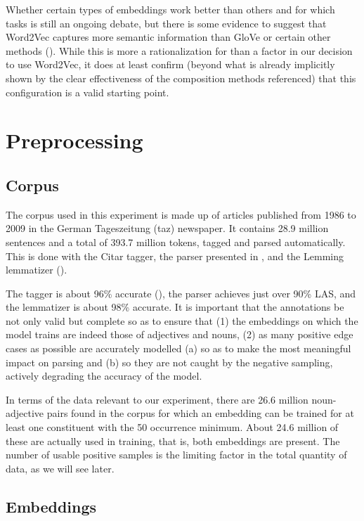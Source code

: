 \documentclass[a4paper, 11pt]{scrartcl}
\begin{document}
Whether certain types of embeddings work better than others and for which tasks is still an ongoing debate, but there is some evidence to suggest that Word2Vec captures more semantic information than GloVe or certain other methods (\cite{SchnabelEmbeddings}). While this is more a rationalization for than a factor in our decision to use Word2Vec, it does at least confirm (beyond what is already implicitly shown by the clear effectiveness of the composition methods referenced) that this configuration is a valid starting point.


\section{Preprocessing}

\subsection{Corpus}

The corpus used in this experiment is made up of articles published from 1986 to 2009 in the German Tageszeitung (taz) newspaper. It contains 28.9 million sentences and a total of 393.7 million tokens, tagged and parsed automatically. This is done with the Citar tagger, the parser presented in \cite{deKokParsing}, and the Lemming lemmatizer (\cite{Lemming}).

The tagger is about 96\% accurate (\cite{PlankVanNoord}), the parser achieves just over 90\% LAS, and the lemmatizer is about 98\% accurate. It is important that the annotations be not only valid but complete so as to ensure that (1) the embeddings on which the model trains are indeed those of adjectives and nouns, (2) as many positive edge cases as possible are accurately modelled (a) so as to make the most meaningful impact on parsing and (b) so they are not caught by the negative sampling, actively degrading the accuracy of the model.

In terms of the data relevant to our experiment, there are 26.6 million noun-adjective pairs found in the corpus for which an embedding can be trained for at least one constituent with the 50 occurrence minimum. About 24.6 million of these are actually used in training, that is, both embeddings are present. The number of usable positive samples is the limiting factor in the total quantity of data, as we will see later.

\subsection{Embeddings}
\end{document}

